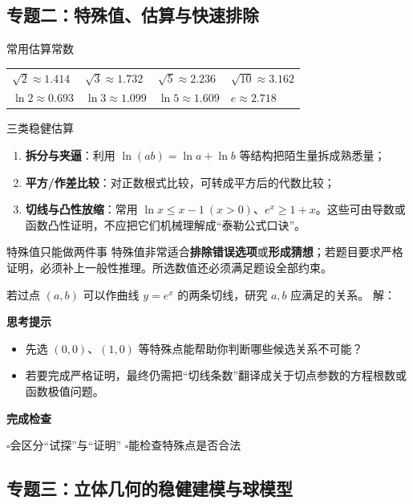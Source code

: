 \documentclass[11pt,a4paper]{ctexart}
\newcommand{\problemheader}[1]{\par\medskip\noindent{\large\bfseries #1}\par\smallskip}
\newcommand{\answerblank}[2][3cm]{\noindent #2\par\vspace{#1}}
\newcommand{\checkbox}{$\square$}
\newcommand{\postproblem}[3]{%
    \begin{tcolorbox}[breakable,colback=black!1,colframe=black!35,title=复盘]
    \textbf{思考提示}\begin{itemize}#1\end{itemize}
    \textbf{完成检查}\par #2\par\vspace{#3}
    \end{tcolorbox}}
\providecommand{\checkbox}{$\square$}
\begin{document}
\newpage

\subsection{专题二：特殊值、估算与快速排除}

\begin{theorembox}{常用估算常数}
\begin{center}
\begin{tabularx}{0.88\textwidth}{XXXX}
\toprule
$\sqrt2\approx1.414$ & $\sqrt3\approx1.732$ & $\sqrt5\approx2.236$ & $\sqrt{10}\approx3.162$\\
$\ln2\approx0.693$ & $\ln3\approx1.099$ & $\ln5\approx1.609$ & $e\approx2.718$\\
\bottomrule
\end{tabularx}
\end{center}
\end{theorembox}

\begin{theorembox}{三类稳健估算}
\begin{enumerate}
  \item \textbf{拆分与夹逼}：利用 $\ln(ab)=\ln a+\ln b$ 等结构把陌生量拆成熟悉量；
  \item \textbf{平方/作差比较}：对正数根式比较，可转成平方后的代数比较；
  \item \textbf{切线与凸性放缩}：常用 $\ln x\le x-1\ (x>0)$、$e^x\ge1+x$。这些可由导数或函数凸性证明，不应把它们机械理解成“泰勒公式口诀”。
\end{enumerate}
\end{theorembox}

\begin{warningbox}{特殊值只能做两件事}
特殊值非常适合\textbf{排除错误选项}或\textbf{形成猜想}；若题目要求严格证明，必须补上一般性推理。所选数值还必须满足题设全部约束。
\end{warningbox}

\problemheader{经典训练二：特殊值卡边界}
{\small 若过点 $(a,b)$ 可以作曲线 $y=e^x$ 的两条切线，研究 $a,b$ 应满足的关系。}
\answerblank[3.8cm]{解：}
\postproblem{
  \item 先选 $(0,0)$、$(1,0)$ 等特殊点能帮助你判断哪些候选关系不可能？
  \item 若要完成严格证明，最终仍需把“切线条数”翻译成关于切点参数的方程根数或函数极值问题。
}{
  \checkbox 会区分“试探”与“证明”\quad
  \checkbox 能检查特殊点是否合法
}{1.0cm}

\newpage

\subsection{专题三：立体几何的稳健建模与球模型}
\end{document}
